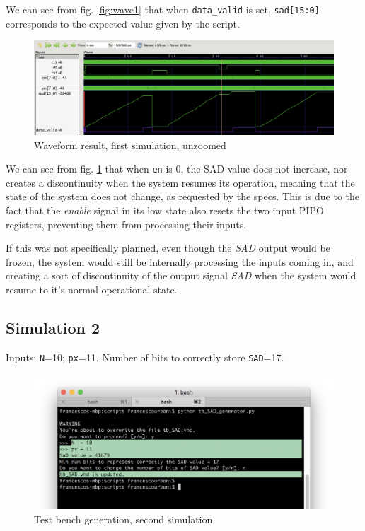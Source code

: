 \documentclass[12pt, a4paper]{article}
\begin{document}
We can see from fig. \ref{fig:wave1} that when \texttt{data\_valid} is set, \texttt{sad[15:0]} corresponds to the expected value given by the script.


\begin{figure}[h!]
\includegraphics[scale=0.18]{../screenshots/gtkwave/sim1_gtkwave2.png}
\caption{Waveform result, first simulation, unzoomed}\label{fig:wave2}
\end{figure}


We can see from fig. \ref{fig:wave2} that when \texttt{en} is 0, the SAD value does not increase, nor creates a discontinuity when the system resumes its operation, meaning that the state of the system does not change, as requested by the specs. 
This is due to the fact that the \textit{enable} signal in its low state also resets the two input PIPO registers, preventing them from processing their inputs.

If this was not specifically planned, even though the \textit{SAD} output would be frozen, the system would still be internally processing the inputs coming in, and creating a sort of discontinuity of the output signal \textit{SAD} when the system would resume to it's normal operational state.





\subsection{Simulation 2}

Inputs: \texttt{N}=10; \texttt{px}=11. Number of bits to correctly store \texttt{SAD}=17.

\begin{figure}[h!]
\includegraphics[scale=0.5]{../screenshots/gtkwave/sim2_term.png}
\caption{Test bench generation, second simulation}\label{fig:term2}
\end{figure}
\end{document}

